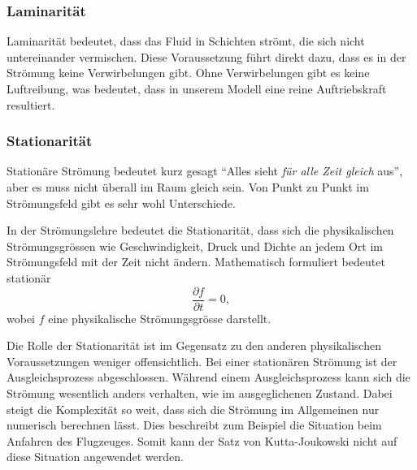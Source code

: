 \subsubsection{Laminarität}
%
	Laminarität bedeutet, dass das Fluid in Schichten strömt, die sich nicht untereinander vermischen.
	Diese Voraussetzung führt direkt dazu, dass es in der Strömung keine Verwirbelungen gibt.
	Ohne Verwirbelungen gibt es keine Luftreibung, was bedeutet,
	dass in unserem Modell eine reine Auftriebskraft resultiert.
	
\subsubsection{Stationarität}
%
	Stationäre Strömung bedeutet kurz gesagt 
	``Alles sieht \emph{für alle Zeit gleich} aus'',
	aber es muss nicht überall im Raum gleich sein.
	Von Punkt zu Punkt im Strömungsfeld gibt es sehr wohl Unterschiede.
	
	In der Strömungslehre bedeutet die Stationarität,
	dass sich die physikalischen Strömungsgrössen wie Geschwindigkeit, Druck und Dichte an jedem Ort im Strömungsfeld mit der Zeit nicht ändern.
%	
	Mathematisch formuliert bedeutet stationär
	\[
		\frac{\partial f}{\partial t}
		=
		0,
	\]
	wobei $f$ eine physikalische Strömungsgrösse darstellt.
	
	Die Rolle der Stationarität ist im Gegensatz zu den anderen physikalischen Voraussetzungen weniger offensichtlich.
	Bei einer stationären Strömung ist der Ausgleichsprozess abgeschlossen.
	Während einem Ausgleichsprozess kann sich die Strömung wesentlich anders verhalten, wie im ausgeglichenen Zustand.
	Dabei steigt die Komplexität so weit, dass sich die Strömung im Allgemeinen nur numerisch berechnen lässt.
	Dies beschreibt zum Beispiel die Situation beim Anfahren des Flugzeuges.
	Somit kann der Satz von Kutta-Joukowski nicht auf diese Situation angewendet werden. 
	

